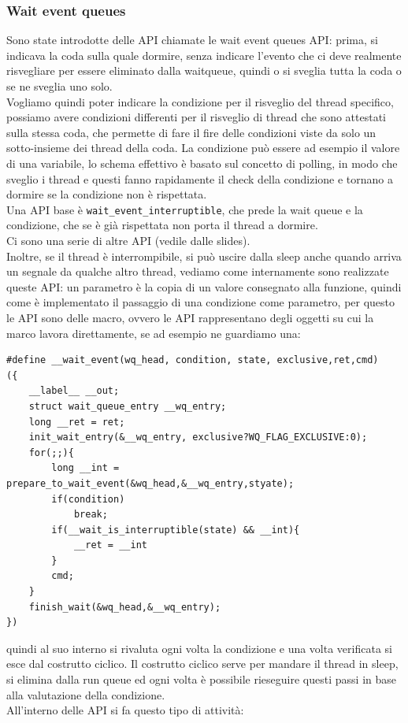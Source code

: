 \documentclass[12pt, oneside]{extbook}
\begin{document}
\subsubsection{Wait event queues}
Sono state introdotte delle API chiamate le wait event queues API: prima, si indicava la coda sulla quale dormire, senza indicare l'evento che ci deve realmente risvegliare per essere eliminato dalla waitqueue, quindi o si sveglia tutta la coda o se ne sveglia uno solo.\\Vogliamo quindi poter indicare la condizione per il risveglio del thread specifico, possiamo avere condizioni differenti per il risveglio di thread che sono attestati sulla stessa coda, che permette di fare il fire delle condizioni viste da solo un sotto-insieme dei thread della coda. La condizione può essere ad esempio il valore di una variabile, lo schema effettivo è basato sul concetto di polling, in modo che sveglio i thread e questi fanno rapidamente il check della condizione e tornano a dormire se la condizione non è rispettata.\\Una API base è \texttt{wait\_event\_interruptible}, che prede la wait queue e la condizione, che se è già rispettata non porta il thread a dormire.\\Ci sono una serie di altre API (vedile dalle slides).\\Inoltre, se il thread è interrompibile, si può uscire dalla sleep anche quando arriva un segnale da qualche altro thread, vediamo come internamente sono realizzate queste API: un parametro è la copia di un valore consegnato alla funzione, quindi come è implementato il passaggio di una condizione come parametro, per questo le API sono delle macro, ovvero le API rappresentano degli oggetti su cui la marco lavora direttamente, se ad esempio ne guardiamo una:
\begin{lstlisting}
#define __wait_event(wq_head, condition, state, exclusive,ret,cmd)
({
	__label__ __out;
	struct wait_queue_entry __wq_entry;
	long __ret = ret;
	init_wait_entry(&__wq_entry, exclusive?WQ_FLAG_EXCLUSIVE:0);
	for(;;){
		long __int = prepare_to_wait_event(&wq_head,&__wq_entry,styate);
		if(condition)
			break;
		if(__wait_is_interruptible(state) && __int){
			__ret = __int
		}
		cmd;
	}
	finish_wait(&wq_head,&__wq_entry);
})
\end{lstlisting}
quindi al suo interno si rivaluta ogni volta la condizione e una volta verificata si esce dal costrutto ciclico. Il costrutto ciclico serve per mandare il thread in sleep, si elimina dalla run queue ed ogni volta è possibile rieseguire questi passi in base alla valutazione della condizione.\\All'interno delle API si fa questo tipo di attività:
\end{document}

